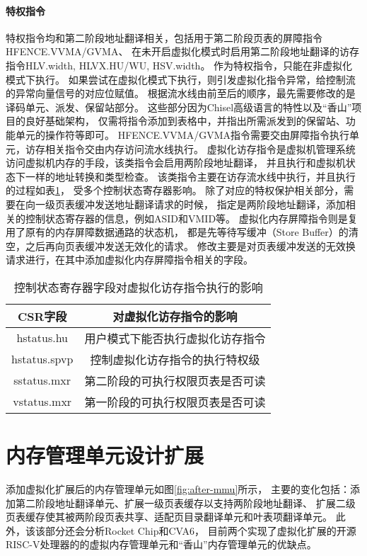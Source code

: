 \paragraph{特权指令}
特权指令均和第二阶段地址翻译相关，包括用于第二阶段页表的屏障指令HFENCE.VVMA/GVMA、
在未开启虚拟化模式时启用第二阶段地址翻译的访存指令HLV.width, HLVX.HU/WU, HSV.width。
作为特权指令，只能在非虚拟化模式下执行。
如果尝试在虚拟化模式下执行，则引发虚拟化指令异常，给控制流的异常向量信号的对应位赋值。
根据流水线由前至后的顺序，最先需要修改的是译码单元、派发、保留站部分。
这些部分因为Chisel高级语言的特性以及“香山”项目的良好基础架构，
仅需将指令添加到表格中，并指出所需派发到的保留站、功能单元的操作符等即可。
HFENCE.VVMA/GVMA指令需要交由屏障指令执行单元，访存相关指令交由内存访问流水线执行。
虚拟化访存指令是虚拟机管理系统访问虚拟机内存的手段，该类指令会启用两阶段地址翻译，
并且执行和虚拟机状态下一样的地址转换和类型检查。
该类指令主要在访存流水线中执行，并且执行的过程如表\ref{tab:h-ls}，
受多个控制状态寄存器影响。
除了对应的特权保护相关部分，需要在向一级页表缓冲发送地址翻译请求的时候，
指定是两阶段地址翻译，添加相关的控制状态寄存器的信息，例如ASID和VMID等。
虚拟化内存屏障指令则是复用了原有的内存屏障数据通路的状态机，
都是先等待写缓冲（Store Buffer）的清空，之后再向页表缓冲发送无效化的请求。
修改主要是对页表缓冲发送的无效换请求进行，在其中添加虚拟化内存屏障指令相关的字段。

\begin{table}
    \centering
    \caption{控制状态寄存器字段对虚拟化访存指令执行的影响}
    \begin{tabular}{cc}
        \toprule
        CSR字段        & 对虚拟化访存指令的影响      \\
        \midrule
        hstatus.hu   & 用户模式下能否执行虚拟化访存指令 \\
        hstatus.spvp & 控制虚拟化访存指令的执行特权级  \\
        sstatus.mxr  & 第二阶段的可执行权限页表是否可读 \\
        vstatus.mxr  & 第一阶段的可执行权限页表是否可读 \\
        \bottomrule
    \end{tabular}
    \label{tab:h-ls}
\end{table}

\section{内存管理单元设计扩展}
添加虚拟化扩展后的内存管理单元如图\ref{fig:after-mmu}所示，
主要的变化包括：添加第二阶段地址翻译单元、扩展一级页表缓存以支持两阶段地址翻译、
扩展二级页表缓存使其被两阶段页表共享、适配页目录翻译单元和叶表项翻译单元。
此外，该该部分还会分析Rocket Chip和CVA6，
目前两个实现了虚拟化扩展的开源RISC-V处理器的的虚拟内存管理单元和“香山”内存管理单元的优缺点。


